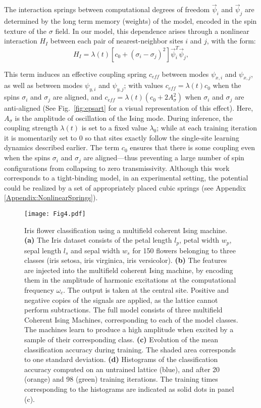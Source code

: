 
The interaction springs between computational degrees of freedom $\vec{\psi}_i$ and $\vec{\psi}_j$ are determined by the long term memory (weights) of the model, encoded in the spin texture of the $\sigma$ field. In our model, this dependence arises through a nonlinear interaction $H_I$ between each pair of nearest-neighbor sites $i$ and $j$, with the form:
\begin{equation}
H_I=\lambda(t)\left[c_0 + (\sigma_i-\sigma_j)^2 \right]\vec{\psi}_i^T \vec{\psi}_j,
\label{eqn:interactionpotential}
\end{equation}

This term induces an effective coupling spring $c_{eff}$ between modes $\psi_{x,i}$ and $\psi_{x,j}$, as well as between modes $\psi_{y,i}$ and $\psi_{y,j}$; with values $c_{eff}=\lambda(t)c_0$ when the spins $\sigma_i$ and $\sigma_j$ are aligned, and $c_{eff}=\lambda(t)(c_0+2A_{\sigma}^2)$ when $\sigma_i$ and $\sigma_j$ are anti-aligned (See Fig.~\ref{fig:epsart} for a visual representation of this effect). Here, $A_{\sigma}$ is the amplitude of oscillation of the Ising mode. During inference, the coupling strength $\lambda(t)$ is set to a fixed value $\lambda_0$; while at each training iteration it is momentarily set to $0$ so that sites exactly follow the single-site learning dynamics described earlier. The term $c_0$ ensures that there is some coupling even when the spins $\sigma_i$ and $\sigma_j$ are aligned---thus preventing a large number of spin configurations from collapsing to zero transmissivity. Although this work corresponds to a tight-binding model, in an experimental setting, the potential could be realized by a set of appropriately placed cubic springs (see Appendix \ref{Appendix:NonlinearSprings}).


\begin{figure}[b!]
\texttt{[image: Fig4.pdf]}
\caption{Iris flower classification using a multifield coherent Ising machine. \textbf{(a)} The Iris dataset consists of the petal length $l_p$, petal width $w_p$, sepal length $l_s$ and sepal width $w_s$ for 150 flowers belonging to three classes (iris setosa, iris virginica, iris versicolor). \textbf{(b)} The features are injected into the multifield coherent Ising machine, by encoding them in the amplitude of harmonic excitations at the computational frequency $\omega_c$. The output is taken at the central site. Positive and negative copies of the signals are applied, as the lattice cannot perform subtractions. The full model consists of three multifield Coherent Ising Machines, corresponding to each of the model classes. The machines learn to produce a high amplitude when excited by a sample of their corresponding class. \textbf{(c)} Evolution of the mean classification accuracy during training. The shaded area corresponds to one standard deviation. \textbf{(d)} Histograms of the classification accuracy computed on an untrained lattice (blue), and after 20 (orange) and 98 (green) training iterations. The training times corresponding to the histograms are indicated as solid dots in panel (c).}
\label{fig:iris} 
\vspace{-15  pt}
\end{figure}

